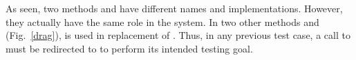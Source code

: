 


As seen, two methods  and 
have different names and implementations. However, they actually
have the same role in the system. In two other methods 
and  (Fig.~\ref{drag}),  is used
in replacement of . Thus, in any
previous test case, a call to  must
be redirected to  to perform its intended testing
goal.








